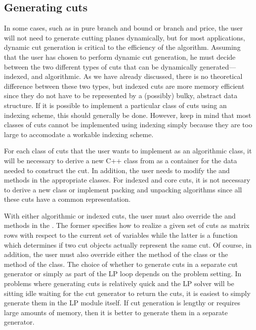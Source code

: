 \subsection{Generating cuts}

In some cases, such as in pure branch and bound or branch and price,
the user will not need to generate cutting planes dynamically, but for
most applications, dynamic cut generation is critical to the
efficiency of the algorithm. Assuming that the user has chosen to
perform dynamic cut generation, he must decide between the two
different types of cuts that can be dynamically generated---indexed,
and algorithmic. As we have already discussed, there is no theoretical
difference between these two types, but indexed cuts are more memory
efficient since they do not have to be represented by a (possibly)
bulky, abstract data structure. If it is possible to implement a
particular class of cuts using an indexing scheme, this should
generally be done. However, keep in mind that most classes of cuts
cannot be implemented using indexing simply because they are too
large to accomodate a workable indexing scheme.

For each class of cuts that the user wants to implement as an
algorithmic class, it will be necessary to derive a new C++ class from
 as a container for the data needed to construct
the cut. In addition, the user needs to modify the 
 and  methods in the
appropriate  classes. For indexed and core cuts, it
is not necessary to derive a new class or implement packing and
unpacking algorithms since all these cuts have a common
representation.

With either algorithmic or indexed cuts, the user must also override
the  and  methods in the
. The former specifies how to realize a given
set of cuts as matrix rows with respect to the current set of
variables while the latter is a function which determines if two cut
objects actually represent the same cut. Of course, in addition, the
user must also override either the  method of
the  class or the 
method of the  class. The choice of whether to
generate cuts in a separate cut generator or simply as part of the LP
loop depends on the problem setting. In problems where generating cuts
is relatively quick and the LP solver will be sitting idle waiting for
the cut generator to return the cuts, it is easiest to simply generate
them in the LP module itself. If cut generation is lengthy or requires
large amounts of memory, then it is better to generate them in a
separate generator.

